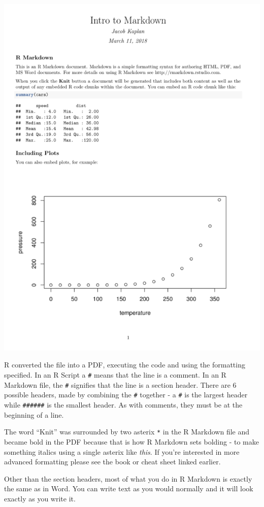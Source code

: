 \documentclass[
  12pt,
]{book}
\begin{document}
\includegraphics{images/markdown_output_example.PNG}

R converted the file into a PDF, executing the code and using the formatting specified. In an R Script a \texttt{\#} means that the line is a comment. In an R Markdown file, the \texttt{\#} signifies that the line is a section header. There are 6 possible headers, made by combining the \texttt{\#} together - a \texttt{\#} is the largest header while \texttt{\#\#\#\#\#\#} is the smallest header. As with comments, they must be at the beginning of a line.

The word ``Knit'' was surrounded by two asterix \texttt{*} in the R Markdown file and became bold in the PDF because that is how R Markdown sets bolding - to make something italics using a single asterix like \emph{this}. If you're interested in more advanced formatting please see the book or cheat sheet linked earlier.

Other than the section headers, most of what you do in R Markdown is exactly the same as in Word. You can write text as you would normally and it will look exactly as you write it.
\end{document}
